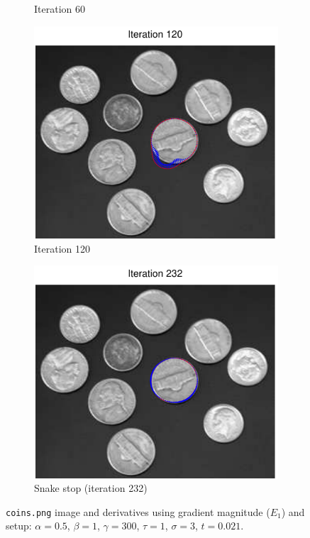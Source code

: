 \documentclass[11pt,a4paper]{article}
\begin{document}
\begin{figure}[H]
\begin{subfigure}[t]{0.24\textwidth}
        \caption{Iteration 60}
        \label{fig:coins_60}
    \end{subfigure}
    \begin{subfigure}[t]{0.24\textwidth}
        \includegraphics[width=\textwidth]{src/images/coins_gradient_120.pdf}
        \caption{Iteration 120}
        \label{fig:coins_120}
    \end{subfigure}
    \begin{subfigure}[t]{0.24\textwidth}
        \includegraphics[width=\textwidth]{src/images/coins_gradient_232.pdf}
        \caption{Snake stop (iteration 232)}
        \label{fig:coins_232}
    \end{subfigure}
    \caption{\texttt{coins.png} image and derivatives using gradient magnitude
($E_1$) and setup: $\alpha = 0.5$, $\beta = 1$, $\gamma = 300$, $\tau = 1$,
$\sigma = 3$, $t = 0.021$.}
    \label{fig:coins}
\end{figure}
\end{document}

